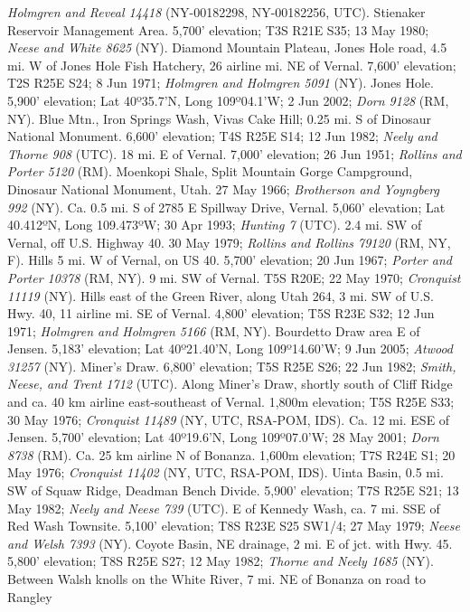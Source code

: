 \textit{Holmgren and Reveal 14418} (NY-00182298, NY-00182256, UTC).
Stienaker Reservoir Management Area. 5,700' elevation; T3S R21E S35;
13 May 1980; \textit{Neese and White 8625} (NY).
Diamond Mountain Plateau, Jones Hole road, 4.5 mi. W of Jones Hole Fish Hatchery,
26 airline mi. NE of Vernal. 7,600' elevation; T2S R25E S24; 8 Jun 1971;
\textit{Holmgren and Holmgren 5091} (NY).
Jones Hole. 5,900' elevation; Lat 40º35.7'N, Long 109º04.1'W; 2 Jun 2002;
\textit{Dorn 9128} (RM, NY).
Blue Mtn., Iron Springs Wash, Vivas Cake Hill; 0.25 mi. S of Dinosaur National
Monument. 6,600' elevation; T4S R25E S14; 12 Jun 1982;
\textit{Neely and Thorne 908} (UTC).
18 mi. E of Vernal. 7,000' elevation; 26 Jun 1951;
\textit{Rollins and Porter 5120} (RM).
Moenkopi Shale, Split Mountain Gorge Campground, Dinosaur National Monument,
Utah. 27 May 1966; \textit{Brotherson and Yoyngberg 992} (NY).
Ca. 0.5 mi. S of 2785 E Spillway Drive, Vernal. 5,060' elevation;
Lat 40.412ºN, Long 109.473ºW; 30 Apr 1993; \textit{Hunting 7} (UTC).
2.4 mi. SW of Vernal, off U.S. Highway 40. 30 May 1979;
\textit{Rollins and Rollins 79120} (RM, NY, F).
Hills 5 mi. W of Vernal, on US 40. 5,700' elevation; 20 Jun 1967;
\textit{Porter and Porter 10378} (RM, NY).
9 mi. SW of Vernal. T5S R20E; 22 May 1970; \textit{Cronquist 11119} (NY).
Hills east of the Green River, along Utah 264, 3 mi. SW of U.S. Hwy. 40, 11
airline mi. SE of Vernal. 4,800' elevation; T5S R23E S32; 12 Jun 1971;
\textit{Holmgren and Holmgren 5166} (RM, NY).
Bourdetto Draw area E of Jensen. 5,183' elevation;
Lat 40º21.40'N, Long 109º14.60'W; 9 Jun 2005; \textit{Atwood 31257} (NY).
Miner's Draw. 6,800' elevation; T5S R25E S26; 22 Jun 1982;
\textit{Smith, Neese, and Trent 1712} (UTC).
Along Miner's Draw, shortly south of Cliff Ridge and ca. 40 km airline
east-southeast of Vernal. 1,800m elevation; T5S R25E S33; 30 May 1976;
\textit{Cronquist 11489} (NY, UTC, RSA-POM, IDS).
Ca. 12 mi. ESE of Jensen. 5,700' elevation; Lat 40º19.6'N, Long 109º07.0'W;
28 May 2001; \textit{Dorn 8738} (RM).
Ca. 25 km airline N of Bonanza. 1,600m elevation; T7S R24E S1; 20 May 1976;
\textit{Cronquist 11402} (NY, UTC, RSA-POM, IDS).
Uinta Basin, 0.5 mi. SW of Squaw Ridge, Deadman Bench Divide. 5,900' elevation;
T7S R25E S21; 13 May 1982; \textit{Neely and Neese 739} (UTC).
E of Kennedy Wash, ca. 7 mi. SSE of Red Wash Townsite. 5,100' elevation;
T8S R23E S25 SW1/4; 27 May 1979; \textit{Neese and Welsh 7393} (NY).
Coyote Basin, NE drainage, 2 mi. E of jct. with Hwy. 45. 5,800' elevation;
T8S R25E S27; 12 May 1982; \textit{Thorne and Neely 1685} (NY).
Between Walsh knolls on the White River, 7 mi. NE of Bonanza on road to Rangley
